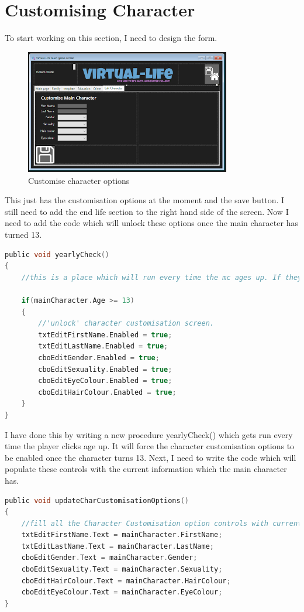 \section{Customising Character}
To start working on this section, I need to design the form.
\begin{figure}[H]
    \centering
    \includegraphics[width=0.8\textwidth]{images/implementation/customise1.png}
    \caption{Customise character options}
    \label{fig:implementation-customise1}
\end{figure}
\noindent This just has the customisation options at the moment and the save button. I still need to add the end life section to the right hand side of the screen. 
Now I need to add the code which will unlock these options once the main character has turned 13.
\begin{lstlisting}[language=c, style=csharp, caption=Yearly Check subroutine]
public void yearlyCheck()
{
    //this is a place which will run every time the mc ages up. If they are older than the specified age then will run code in relevant section.

    if(mainCharacter.Age >= 13)
    {
        //'unlock' character customisation screen.
        txtEditFirstName.Enabled = true;
        txtEditLastName.Enabled = true;
        cboEditGender.Enabled = true;
        cboEditSexuality.Enabled = true;
        cboEditEyeColour.Enabled = true;
        cboEditHairColour.Enabled = true;
    }
}
\end{lstlisting}
I have done this by writing a new procedure yearlyCheck() which gets run every time the player clicks age up. It will force the character customisation options to be enabled once the character turns 13. 
Next, I need to write the code which will populate these controls with the current information which the main character has.
\begin{lstlisting}[language=c, style=csharp, caption=Subroutine to update character customisaiton options]
public void updateCharCustomisationOptions()
{
    //fill all the Character Customisation option controls with current information from main char object
    txtEditFirstName.Text = mainCharacter.FirstName;
    txtEditLastName.Text = mainCharacter.LastName;
    cboEditGender.Text = mainCharacter.Gender;
    cboEditSexuality.Text = mainCharacter.Sexuality;
    cboEditHairColour.Text = mainCharacter.HairColour;
    cboEditEyeColour.Text = mainCharacter.EyeColour;
}
\end{lstlisting}
